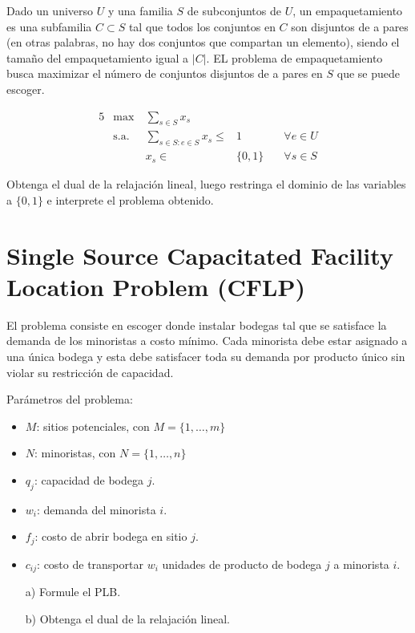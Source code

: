 \documentclass[10pt]{article}
\theoremstyle{plain}
\theoremstyle{definition}
\begin{document}
 Dado un universo $U$ y una familia $S$ de subconjuntos de $U$, un empaquetamiento es una subfamilia $C\subset S$ tal que todos los conjuntos en $C$ son disjuntos de a pares (en otras palabras, no hay dos conjuntos que compartan un elemento), siendo el tamaño del empaquetamiento igual a $|C|$. EL problema de empaquetamiento busca maximizar el número de conjuntos disjuntos de a pares en $S$ que se puede escoger.

\begin{center}
\begin{alignat*}{5}
&\max\ & \sum_{s \in S}x_{s}\\
&\text{s.a. } &  \sum_{s \in S:e \in S}x_{s}  \leq  &1 &\quad \forall e \in U\\
&& x_{s}  \in  &\{0,1\} &\quad \forall s \in S
\end{alignat*}
\end{center}

Obtenga el dual de la relajación lineal, luego restringa el dominio de las variables a $\{0,1\}$ e interprete el problema obtenido.

\section{Single Source Capacitated Facility Location Problem (CFLP)}
El problema consiste en escoger donde instalar bodegas tal que se satisface la demanda de los minoristas a costo mínimo. Cada minorista debe estar asignado a una única bodega y esta debe satisfacer toda su demanda por producto único sin violar su restricción de capacidad.

Parámetros del problema:
\begin{itemize}
    \item $M$: sitios potenciales, con $M = \{1, \ldots, m\}$
    \item $N$: minoristas, con $N = \{1, \ldots, n\}$
    \item $q_{j}$: capacidad de bodega $j$.
    \item $w_{i}$: demanda del minorista $i$.
    \item $f_{j}$: costo de abrir bodega en sitio $j$.
    \item $c_{ij}$: costo de transportar $w_{i}$ unidades de producto de bodega $j$ a minorista $i$.
\end{itemize}

\begin{itemize}
    \item[a)] Formule el PLB.
    \item[b)] Obtenga el dual de la relajación lineal.
\end{itemize}
\end{document}
